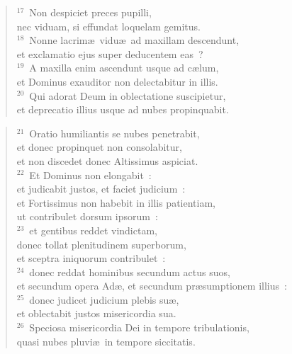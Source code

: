 \begin{verse}
${}^{17}$~Non despiciet preces pupilli,\\ nec viduam, si effundat loquelam gemitus.\\
${}^{18}$~Nonne lacrim\ae\ vidu\ae\ ad maxillam descendunt,\\ et exclamatio ejus super deducentem eas~?\\
${}^{19}$~A maxilla enim ascendunt usque ad c\ae lum,\\ et Dominus exauditor non delectabitur in illis.\\
${}^{20}$~Qui adorat Deum in oblectatione suscipietur,\\ et deprecatio illius usque ad nubes propinquabit.\end{verse}


\begin{verse}${}^{21}$~Oratio humiliantis se nubes penetrabit,\\ et donec propinquet non consolabitur,\\ et non discedet donec Altissimus aspiciat.\\
${}^{22}$~Et Dominus non elongabit~:\\ et judicabit justos, et faciet judicium~:\\ et Fortissimus non habebit in illis patientiam,\\ ut contribulet dorsum ipsorum~:\\
${}^{23}$~et gentibus reddet vindictam,\\ donec tollat plenitudinem superborum,\\ et sceptra iniquorum contribulet~:\\
${}^{24}$~donec reddat hominibus secundum actus suos,\\ et secundum opera Ad\ae , et secundum pr\ae sumptionem illius~:\\
${}^{25}$~donec judicet judicium plebis su\ae ,\\ et oblectabit justos misericordia sua.\\
${}^{26}$~Speciosa misericordia Dei in tempore tribulationis,\\ quasi nubes pluvi\ae\ in tempore siccitatis.\end{verse}


